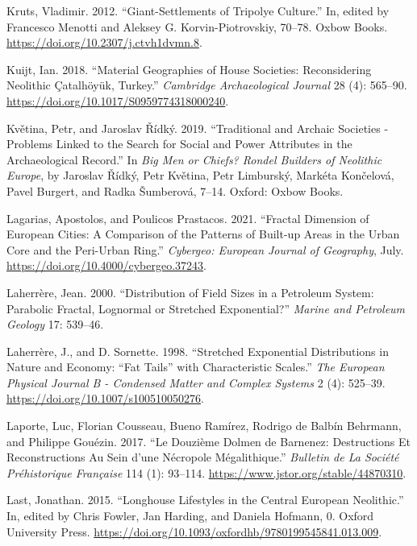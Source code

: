 \documentclass[
  12pt,
  a4paper, twoside]{book}
\newlength{\cslhangindent}
\newlength{\cslentryspacingunit} %
\newenvironment{CSLReferences}[2] %
 {%
  \setlength{\parindent}{0pt}
  \ifodd #1
  \let\oldpar\par
  \def\par{\hangindent=\cslhangindent\oldpar}
  \fi
  \setlength{\parskip}{#2\cslentryspacingunit}
 }%
 {}
\begin{document}
\begin{CSLReferences}{1}{0}
\leavevmode{}%
Kruts, Vladimir. 2012. {``Giant-Settlements of Tripolye Culture.''} In, edited by Francesco Menotti and Aleksey G. Korvin-Piotrovskiy, 70--78. Oxbow Books. \url{https://doi.org/10.2307/j.ctvh1dvmn.8}.

\leavevmode{}%
Kuijt, Ian. 2018. {``Material Geographies of House Societies: Reconsidering Neolithic Çatalhöyük, Turkey.''} \emph{Cambridge Archaeological Journal} 28 (4): 565--90. \url{https://doi.org/10.1017/S0959774318000240}.

\leavevmode{}%
Květina, Petr, and Jaroslav Řídký. 2019. {``Traditional and Archaic Societies - Problems Linked to the Search for Social and Power Attributes in the Archaeological Record.''} In \emph{Big Men or Chiefs? {Rondel} Builders of Neolithic {Europe}}, by Jaroslav Řídký, Petr Květina, Petr Limburský, Markéta Končelová, Pavel Burgert, and Radka Šumberová, 7--14. {Oxford}: {Oxbow Books}.

\leavevmode{}%
Lagarias, Apostolos, and Poulicos Prastacos. 2021. {``Fractal Dimension of European Cities: A Comparison of the Patterns of Built-up Areas in the Urban Core and the Peri-Urban Ring.''} \emph{Cybergeo: European Journal of Geography}, July. \url{https://doi.org/10.4000/cybergeo.37243}.

\leavevmode{}%
Laherrère, Jean. 2000. {``Distribution of Field Sizes in a Petroleum System: Parabolic Fractal, Lognormal or Stretched Exponential?''} \emph{Marine and Petroleum Geology} 17: 539--46.

\leavevmode{}%
Laherrère, J., and D. Sornette. 1998. {``Stretched Exponential Distributions in Nature and Economy: {``}Fat Tails{''} with Characteristic Scales.''} \emph{The European Physical Journal B - Condensed Matter and Complex Systems} 2 (4): 525--39. \url{https://doi.org/10.1007/s100510050276}.

\leavevmode{}%
Laporte, Luc, Florian Cousseau, Bueno Ramírez, Rodrigo de Balbín Behrmann, and Philippe Gouézin. 2017. {``Le Douzième Dolmen de Barnenez: Destructions Et Reconstructions Au Sein d'une Nécropole Mégalithique.''} \emph{Bulletin de La Société Préhistorique Française} 114 (1): 93--114. \url{https://www.jstor.org/stable/44870310}.

\leavevmode{}%
Last, Jonathan. 2015. {``Longhouse Lifestyles in the Central European Neolithic.''} In, edited by Chris Fowler, Jan Harding, and Daniela Hofmann, 0. Oxford University Press. \url{https://doi.org/10.1093/oxfordhb/9780199545841.013.009}.


\end{CSLReferences}
\end{document}
